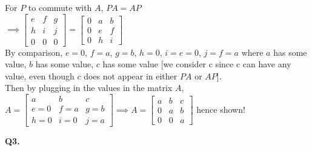 \documentclass[addpoints]{exam}
\begin{document}
\begin{sloppypar}
\begin{questions}
\begin{solution}
        For $P$ to commute with $A$, $ PA = AP $ \\ 
        $ \implies \begin{bmatrix}
            e & f & g \\ h & i & j \\ 0 & 0 & 0
        \end{bmatrix} = \begin{bmatrix}
            0 & a & b \\ 0 & e & f \\ 0 & h & i
        \end{bmatrix} $ \\ 
        By comparison, $ e = 0$, $f = a$, $g = b$, $h = 0$, $i = e = 0$, $j = f = a$ where $a$ has some value, $b$ has some value, $c$ has some value [we consider c since c can have any value, even though $c$ does not appear in either $PA$ or $AP$]. \\ 
        Then by plugging in the values in the matrix $A$, \\ 
        $ A = \begin{bmatrix}
            a & b & c \\ e = 0 & f = a & g = b \\ h = 0 & i = 0 & j = a 
        \end{bmatrix} \implies A = \begin{bmatrix}
            a & b & c \\ 0 & a & b \\ 0 & 0 & a
        \end{bmatrix} $ hence shown!
    \end{solution}

    \question
    \textbf{Q3. } 
    \begin{solution}


\end{solution}
\end{questions}
\end{sloppypar}
\end{document}
